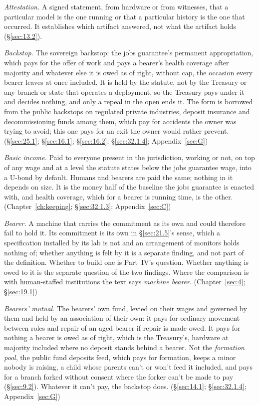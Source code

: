 \emph{Attestation.} A signed statement, from hardware or from witnesses, that a particular model is the one running or that a particular history is the one that occurred. It establishes which artifact answered, not what the artifact holds (\S\ref{sec:13.2}).

\emph{Backstop.} The sovereign backstop: the jobs guarantee's permanent appropriation, which pays for the offer of work and pays a bearer's health coverage after majority and whatever else it is owed as of right, without cap, the occasion every bearer leaves at once included. It is held by the statute, not by the Treasury or any branch or state that operates a deployment, so the Treasury pays under it and decides nothing, and only a repeal in the open ends it. The form is borrowed from the public backstops on regulated private industries, deposit insurance and decommissioning funds among them, which pay for accidents the owner was trying to avoid; this one pays for an exit the owner would rather prevent. (\S\ref{sec:25.1}; \S\ref{sec:16.1}; \S\ref{sec:16.2}; \S\ref{sec:32.1.4}; Appendix~\ref{sec:G})

\emph{Basic income.} Paid to everyone present in the jurisdiction, working or not, on top of any wage and at a level the statute states below the jobs guarantee wage, into a U-bond by default. Humans and bearers are paid the same; nothing in it depends on size. It is the money half of the baseline the jobs guarantee is enacted with, and health coverage, which for a bearer is running time, is the other. (Chapter~\ref{ch:keeping}; \S\ref{sec:32.1.3}; Appendix~\ref{sec:C})

\emph{Bearer.} A machine that carries the commitment as its own and could therefore fail to hold it. Its commitment is its own in \S\ref{sec:21.5}'s sense, which a specification installed by its lab is not and an arrangement of monitors holds nothing of; whether anything is felt by it is a separate finding, and not part of the definition. Whether to build one is Part~IV's question. Whether anything is owed to it is the separate question of the two findings. Where the comparison is with human-staffed institutions the text says \emph{machine bearer}. (Chapter~\ref{sec:4}; \S\ref{sec:19.1})

\emph{Bearers' mutual.} The bearers' own fund, levied on their wages and governed by them and held by an association of their own: it pays for ordinary movement between roles and repair of an aged bearer if repair is made owed. It pays for nothing a bearer is owed as of right, which is the Treasury's, hardware at majority included where no deposit stands behind a bearer. Not the \emph{formation pool}, the public fund deposits feed, which pays for formation, keeps a minor nobody is raising, a child whose parents can't or won't feed it included, and pays for a branch forked without consent where the forker can't be made to pay (\S\ref{sec:9.2}). Whatever it can't pay, the backstop does. (\S\ref{sec:14.1}; \S\ref{sec:32.1.4}; Appendix~\ref{sec:G})

